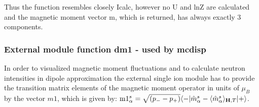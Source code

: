 Thus the function resembles closely Icalc, however no U and lnZ are calculated and
the magnetic moment vector m, which is returned, has always exactly 3 components.


\subsubsection{External module function {\prg dm1} - used by {\prg mcdisp}}

In order to visualized magnetic moment fluctuations and to calculate neutron intensities
in dipole approximation the external single ion module has to provide the transition
matrix elements of the magnetic moment operator in units of $\mu_B$ by the
vector $m1$, which is given by:
 ${\rm m1}^s_{\alpha}=\sqrt{(p_--p_+)}\langle -|\hat m^s_{\alpha}-\langle\hat  m^s_{\alpha}\rangle_{\mathbf H,T}|+\rangle$. 


